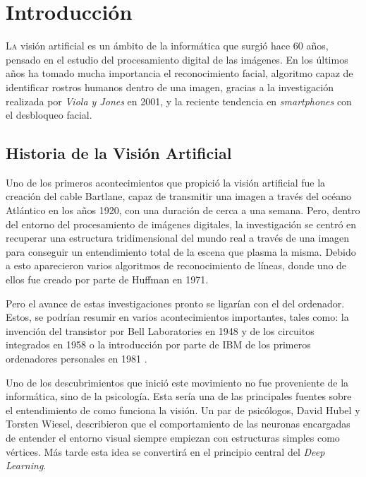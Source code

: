 
\chapter{Introducción}

\lettrine[lines=4]{L}{a} visión artificial  es un ámbito de la informática que surgió hace 60 años, pensado en el estudio del procesamiento digital de las imágenes. En los últimos años ha tomado mucha importancia el reconocimiento facial, algoritmo capaz de identificar rostros humanos dentro de una imagen,  gracias a la investigación realizada por \textit{Viola y Jones} en 2001, y la reciente tendencia en \textit{smartphones} con el desbloqueo facial. 

\section{Historia de la Visión Artificial}

Uno de los primeros acontecimientos que propició la visión artificial fue la creación del cable Bartlane, capaz de transmitir una imagen a través del océano Atlántico en los años 1920, con una duración de cerca a una semana. Pero, dentro del entorno del procesamiento de imágenes digitales, la investigación se centró en recuperar una estructura tridimensional del mundo real a través de una imagen para conseguir un entendimiento total de la escena que plasma la misma. Debido a esto aparecieron varios algoritmos de reconocimiento de líneas, donde uno de ellos fue creado por parte de Huffman en 1971.

Pero el avance de estas investigaciones pronto se ligarían con el del ordenador. Estos, se podrían resumir en varios acontecimientos importantes, tales como: la invención del transistor por Bell Laboratories en 1948 y de los circuitos integrados en 1958 o la introducción por parte de IBM de los primeros ordenadores personales en 1981 \cite{gonzalez_woods_2018}.

Uno de los descubrimientos que inició este movimiento no fue proveniente de la informática, sino de la psicología. Esta sería una de las principales fuentes sobre el entendimiento de como funciona la visión.  Un par de psicólogos, David Hubel y Torsten Wiesel, describieron que el comportamiento de las neuronas encargadas de entender el entorno visual siempre empiezan con estructuras simples como vértices. Más tarde esta idea se convertirá en el principio central del \textit{Deep Learning}.

